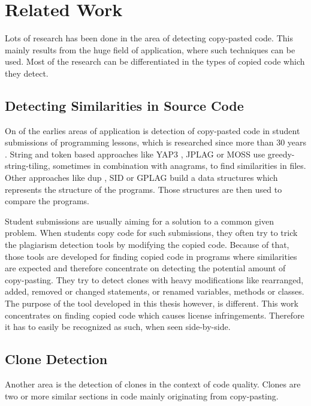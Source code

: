 
\chapter{Related Work}\label{chapter:related_work}
Lots of research has been done in the area of detecting copy-pasted code.
This mainly results from the huge field of application, where such techniques can be used.
Most of the research can be differentiated in the types of copied code which they detect.

\section{Detecting Similarities in Source Code}\label{section:related_work/detecting_similarities}
On of the earlies areas of application is detection of copy-pasted code in student submissions of programming lessons, which is researched since more than 30 years \cite{lancaster2004comparison}.
String and token based approaches like YAP3 \cite{wise1996yap3}, JPLAG \cite{prechelt2002finding} or MOSS \cite{schleimer2003winnowing} use greedy-string-tiling, sometimes in combination with anagrams, to find similarities in files.
Other approaches like dup \cite{baker1995finding}, SID \cite{chen2004shared} or GPLAG \cite{liu2006gplag} build a data structures which represents the structure of the programs.
Those structures are then used to compare the programs.

Student submissions are usually aiming for a solution to a common given problem.
When students copy code for such submissions, they often try to trick the plagiarism detection tools by modifying the copied code.
Because of that, those tools are developed for finding copied code in programs where similarities are expected and therefore concentrate on detecting the potential amount of copy-pasting.
They try to detect clones with heavy modifications like rearranged, added, removed or changed statements, or renamed variables, methods or classes.
The purpose of the tool developed in this thesis however, is different.
This work concentrates on finding copied code which causes license infringements.
Therefore it has to easily be recognized as such, when seen side-by-side.

\section{Clone Detection}\label{section:related_work/clone_detection}
Another area is the detection of clones in the context of code quality.
Clones are two or more similar sections in code mainly originating from copy-pasting.

